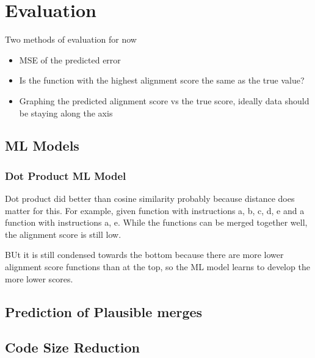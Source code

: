 \chapter{Evaluation}
Two methods of evaluation for now
\begin{itemize}
    \item MSE of the predicted error
    \item Is the function with the highest alignment score the same as the true value?
    \item Graphing the predicted alignment score vs the true score, ideally data should be staying along the axis
\end{itemize}


\section{ML Models}
\subsection{Dot Product ML Model}
Dot product did better than cosine similarity probably because distance does matter for this. For example, given function with instructions a, b, c, d, e and a function with instructions a, e. While the functions can be merged together well, the alignment score is still low.


BUt it is still condensed towards the bottom because there are more lower alignment score functions than at the top, so the ML model learns to develop the more lower scores.


\section{Prediction of Plausible merges}

\section{Code Size Reduction}